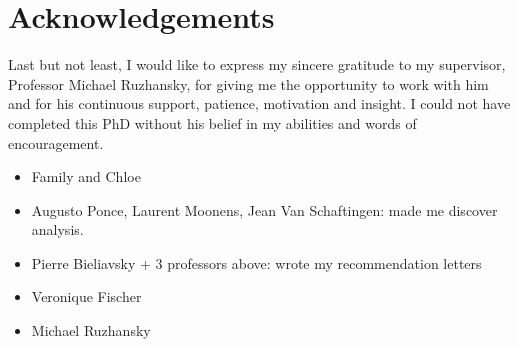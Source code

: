 \chapter*{Acknowledgements}

Last but not least,
I would like to express my sincere gratitude to my supervisor,
Professor Michael Ruzhansky,
for giving me the opportunity to work with him and for his continuous support, patience, motivation and insight.
I could not have completed this PhD without his belief in my abilities and words of encouragement.

\begin{itemize}
    \item Family and Chloe
    \item Augusto Ponce, Laurent Moonens, Jean Van Schaftingen: made me discover analysis.
    \item Pierre Bieliavsky + 3 professors above: wrote my recommendation letters
    \item Veronique Fischer
    \item Michael Ruzhansky
\end{itemize}
